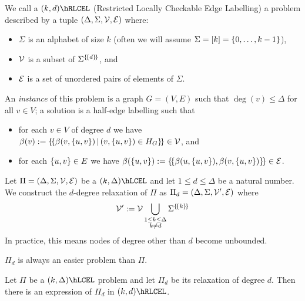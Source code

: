 \documentclass[12pt,a4paper]{article}
\begin{document}
\begin{defn}
    We call a $(k,d)\hRLCEL$ (Restricted Locally Checkable Edge Labelling) a problem described by a tuple $(\Delta,\Sigma,\mathcal{V},\mathcal{E})$ where:
    \begin{itemize}
        \item $\Sigma$ is an alphabet of size $k$ (often we will assume $\Sigma=[k]=\left\{0,\ldots,k-1\right\}$),
        \item $\mathcal{V}$ is a subset of $\Sigma^{\left\lbrace \! \left\lbrace d\right\rbrace \! \right\rbrace}$, and
        \item $\mathcal{E}$ is a set of unordered pairs of elements of $\Sigma$.
    \end{itemize}
    An \emph{instance} of this problem is a graph $G=(V,E)$ such that $\deg(v)\leq\Delta$ for all $v\in V$; a solution is a half-edge labelling such that
    \begin{itemize}
        \item for each $v\in V$ of degree $d$ we have $\beta(v):=\left\lbrace \! \left\lbrace\beta(v,\left\{u,v\right\})\,\middle|\, (v,\left\{u,v\right\})\in H_G\right\rbrace \! \right\rbrace\in\mathcal{V}$, and
        \item for each $\left\{u,v\right\}\in E$ we have $\beta(\left\{u,v\right\}):=\left\lbrace \! \left\lbrace\beta(u,\left\{u,v\right\}),\beta(v,\left\{u,v\right\})\right\rbrace \! \right\rbrace\in\mathcal{E}$.
    \end{itemize}
\end{defn}
\begin{defn}
    Let $\Pi=(\Delta,\Sigma,\mathcal{V},\mathcal{E})$ be a $(k,\Delta)\hLCEL$ and let $1\leq d\leq \Delta$ be a natural number. We construct the $d$-degree relaxation of $\Pi$ as $\Pi_d=(\Delta,\Sigma,\mathcal{V}',\mathcal{E})$ where
    $$\mathcal{V}':=\mathcal{V}\bigcup_{\substack{1\leq k\leq \Delta\\k\neq d}}\Sigma^{\left\lbrace \! \left\lbrace k\right\rbrace \! \right\rbrace}$$
    In practice, this means nodes of degree other than $d$ become unbounded.
\end{defn}
\begin{obs}
    $\Pi_d$ is always an easier problem than $\Pi$.
\end{obs}
\begin{lem}
    Let $\Pi$ be a $(k,\Delta)\hLCEL$ problem and let $\Pi_d$ be its relaxation of degree $d$. Then there is an expression of $\Pi_d$ in $(k,d)\hRLCEL$.
\end{lem}
\end{document}

